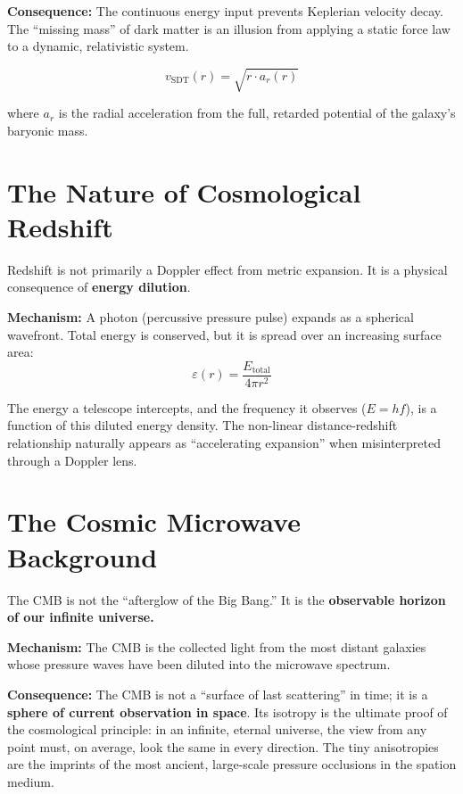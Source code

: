 \textbf{Consequence:} The continuous energy input prevents Keplerian velocity decay.  The ``missing mass'' of dark matter is an illusion from applying a static force law to a dynamic, relativistic system.

\begin{equation}\label{eq:v-galaxy}
  v_{\text{SDT}}(r) = \sqrt{r \cdot a_r(r)}
\end{equation}

where $a_r$ is the radial acceleration from the full, retarded potential of the galaxy's baryonic mass.


\section{The Nature of Cosmological Redshift}

Redshift is not primarily a Doppler effect from metric expansion.  It is a physical consequence of \textbf{energy dilution}.

\textbf{Mechanism:} A photon (percussive pressure pulse) expands as a spherical wavefront.  Total energy is conserved, but it is spread over an increasing surface area:
\begin{equation}\label{eq:dilution}
  \varepsilon(r) = \frac{E_{\text{total}}}{4\pi r^2}
\end{equation}

The energy a telescope intercepts, and the frequency it observes ($E = hf$), is a function of this diluted energy density.  The non-linear distance-redshift relationship naturally appears as ``accelerating expansion'' when misinterpreted through a Doppler lens.


\section{The Cosmic Microwave Background}

The CMB is not the ``afterglow of the Big Bang.''  It is the \textbf{observable horizon of our infinite universe.}

\textbf{Mechanism:} The CMB is the collected light from the most distant galaxies whose pressure waves have been diluted into the microwave spectrum.

\textbf{Consequence:} The CMB is not a ``surface of last scattering'' in time; it is a \textbf{sphere of current observation in space}.  Its isotropy is the ultimate proof of the cosmological principle: in an infinite, eternal universe, the view from any point must, on average, look the same in every direction.  The tiny anisotropies are the imprints of the most ancient, large-scale pressure occlusions in the spation medium.


